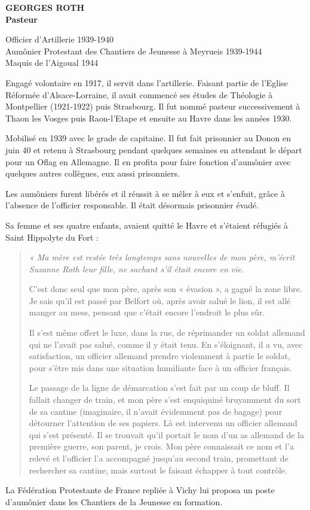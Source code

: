 
\begin{center}
{\Large\bfseries GEORGES ROTH}\\[0.25em]
{\large\bfseries Pasteur}

\vspace{2em}

Officier d’Artillerie 1939-1940\\
Aumônier Protestant des Chantiers de Jeunesse à Meyrueis 1939-1944\\
Maquis de l’Aigoual 1944
\end{center}

\vspace{1em}

Engagé volontaire en 1917, il servit dans l’artillerie. Faisant partie de l’Eglise Réformée
d’Alsace-Lorraine, il avait commencé ses études de Théologie à Montpellier (1921-1922) puis
Strasbourg. Il fut nommé pasteur successivement à Thaon les Vosges puis Raon-l’Etape et
ensuite au Havre dans les années 1930.

Mobilisé en 1939 avec le grade de capitaine. Il fut fait prisonnier au Donon en juin 40 et
retenu à Strasbourg pendant quelques semaines en attendant le départ pour un Oflag en
Allemagne. Il en profita pour faire fonction d’aumônier avec quelques autres collègues, eux
aussi prisonniers.

Les aumôniers furent libérés et il réussit à se mêler à eux et s’enfuit, grâce à l’absence de
l’officier responsable. Il était désormais prisonnier évadé.

Sa femme et ses quatre enfants, avaient quitté le Havre et s’étaient réfugiés à Saint Hippolyte
du Fort :

\begin{quote}\itshape
« Ma mère est restée très longtemps sans nouvelles de mon père, m’écrit Suzanne Roth leur
fille, ne sachant s’il était encore en vie.

C’est donc seul que mon père, après son « évasion », a gagné la zone libre. Je sais qu’il est
passé par Belfort où, après avoir salué le lion, il est allé manger au mess, pensant que c’était
encore l’endroit le plus sûr.

Il s’est même offert le luxe, dans la rue, de réprimander un soldat allemand qui ne l’avait pas
salué, comme il y était tenu. En s’éloignant, il a vu, avec satisfaction, un officier allemand
prendre violemment à partie le soldat, pour s’être mis dans une situation humiliante face à un
officier français.

Le passage de la ligne de démarcation s’est fait par un coup de bluff. Il fallait changer de
train, et mon père s’est enquiquiné bruyamment du sort de sa cantine (imaginaire, il n’avait
évidemment pas de bagage) pour détourner l’attention de ses papiers. Là est intervenu un
officier allemand qui s’est présenté. Il se trouvait qu’il portait le nom d’un as allemand de la
première guerre, son parent, je crois. Mon père connaissait ce nom et l’a relevé et l’officier
l’a accompagné jusqu’au second train, promettant de rechercher sa cantine, mais surtout le
faisant échapper à tout contrôle.
\end{quote}

La Fédération Protestante de France repliée à Vichy lui proposa un poste d’aumônier dans les
Chantiers de la Jeunesse en formation.
